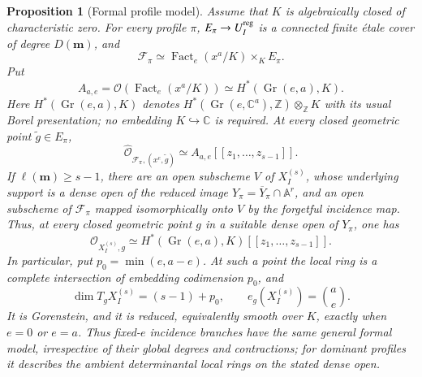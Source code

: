 \documentclass[10pt,fleqn]{article}
\numberwithin{equation}{section}
\newtheorem{proposition}[theorem]{Proposition}
\newcommand{\A}{\mathbb A}
\newcommand{\cF}{\mathcal F}
\newcommand{\Gr}{\operatorname{Gr}}
\newcommand{\Fact}{\operatorname{Fact}}
\begin{document}
\begin{proposition}[Formal profile model]\label{prop:formal-profile-model}
\label{cor:generic-profile-invariants}
Assume that $K$ is algebraically closed of characteristic zero.  For every profile $\pi$,
$E_\pi\to U_I^{\rm reg}$ is a connected finite \emph{\'etale} cover of degree
$D(\boldsymbol m)$, and
\begin{equation}\label{eq:profile-product}
 \cF_\pi\simeq\Fact_e(x^a/K)\times_KE_\pi.
\end{equation}
Put
\begin{equation}\label{eq:zero-factor-algebra}
 A_{a,e}=\mathcal O(\Fact_e(x^a/K))
 \simeq H^*(\Gr(e,a),K).
\end{equation}
Here $H^*(\Gr(e,a),K)$ denotes
$H^*(\Gr(e,\mathbb C^a),\mathbb Z)\otimes_{\mathbb Z}K$
with its usual Borel presentation; no embedding
$K\hookrightarrow\mathbb C$ is required.
At every closed geometric point $\widetilde g\in E_\pi$,
\begin{equation}\label{eq:profile-formal-completion}
 \widehat{\mathcal O}_{\cF_\pi,(x^e,\widetilde g)}
 \simeq A_{a,e}[[z_1,\ldots,z_{s-1}]].
\end{equation}
If $\ell(\boldsymbol m)\ge s-1$, there are an open subscheme $V$ of
$X_I^{(s)}$, whose underlying support is a dense open of the reduced image
$Y_\pi=\overline Y_\pi\cap\A^r$, and an open subscheme of $\cF_\pi$
mapped isomorphically onto $V$ by the forgetful incidence map.
Thus, at every closed geometric point $g$ in a suitable dense open of
$Y_\pi$, one has
\begin{equation}\label{eq:profile-image-completion}
 \widehat{\mathcal O}_{X_I^{(s)},g}
 \simeq H^*(\Gr(e,a),K)[[z_1,\ldots,z_{s-1}]].
\end{equation}
In particular, put $p_0=\min(e,a-e)$.  At such a point the local ring is
a complete intersection of embedding codimension $p_0$, and
\begin{equation}\label{eq:profile-local-invariants}
 \dim T_gX_I^{(s)}=(s-1)+p_0,\qquad
 e_g(X_I^{(s)})=\binom ae.
\end{equation}
It is Gorenstein, and it is reduced, equivalently smooth over $K$, exactly
when $e=0$ or $e=a$.  Thus fixed-$e$ incidence branches have the same
general formal model, irrespective of their global degrees and contractions;
for dominant profiles it describes the ambient determinantal local rings
on the stated dense open.
\end{proposition}
\end{document}
